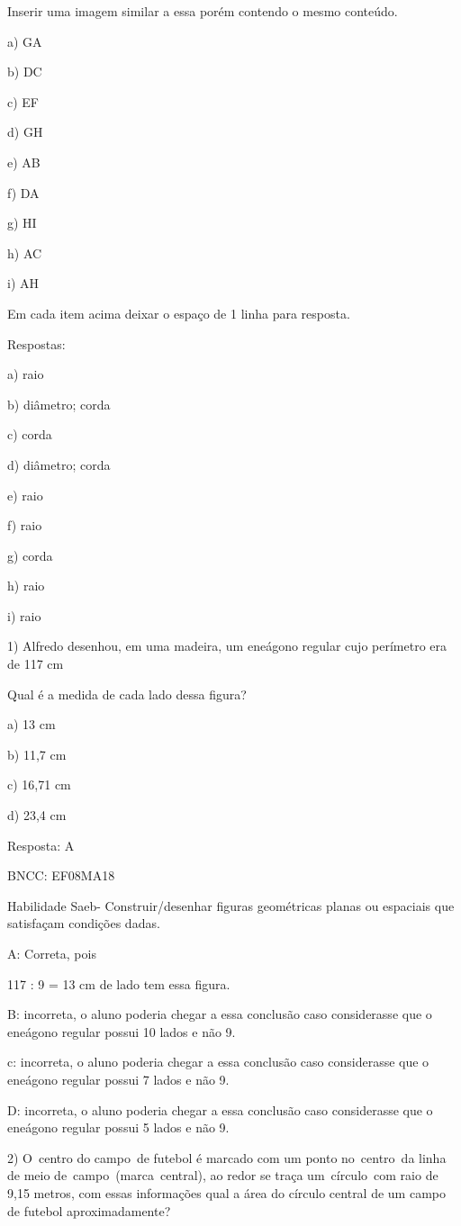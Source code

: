 {Inserir uma imagem similar a essa porém contendo o mesmo conteúdo.

a) GA

b) DC

c) EF

d) GH

e) AB

f) DA

g) HI

h) AC

i) AH

Em cada item acima deixar o espaço de 1 linha para resposta.

Respostas:

a) raio

b) diâmetro; corda

c) corda

d) diâmetro; corda

e) raio

f) raio

g) corda

h) raio

i) raio


1) Alfredo desenhou, em uma madeira, um eneágono regular cujo perímetro
era de 117 cm

Qual é a medida de cada lado dessa figura?

a) 13 cm

b) 11,7 cm

c) 16,71 cm

d) 23,4 cm

Resposta: A

BNCC: EF08MA18

Habilidade Saeb- Construir/desenhar figuras geométricas planas ou
espaciais que satisfaçam condições dadas.

A: Correta, pois

117 : 9 = 13 cm de lado tem essa figura.

B: incorreta, o aluno poderia chegar a essa conclusão caso considerasse
que o eneágono regular possui 10 lados e não 9.

c: incorreta, o aluno poderia chegar a essa conclusão caso considerasse
que o eneágono regular possui 7 lados e não 9.

D: incorreta, o aluno poderia chegar a essa conclusão caso considerasse
que o eneágono regular possui 5 lados e não 9.

2) O~centro do campo~de futebol é marcado com um ponto no~centro~da
linha de meio de~campo~(marca~central), ao redor se traça um~círculo~com
raio de 9,15 metros, com essas informações qual a área do círculo
central de um campo de futebol aproximadamente?

}
